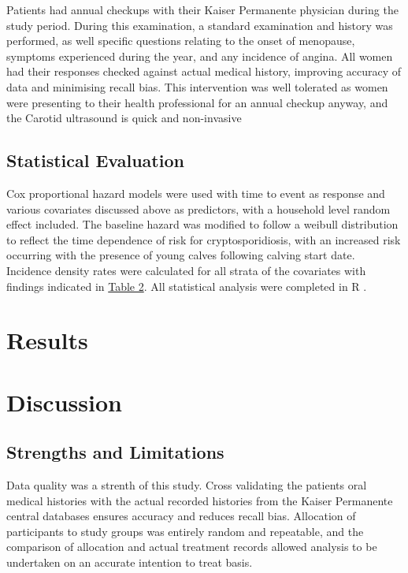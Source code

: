 \documentclass[12pt]{article}
\begin{document}
		
		Patients had annual checkups with their Kaiser Permanente physician during the study period.
		During this examination, a standard examination and history was performed, as well specific questions relating to the onset of menopause, symptoms experienced during the year, and any incidence of angina.
		All women had their responses checked against actual medical history, improving accuracy of data and minimising recall bias.
		This intervention was well tolerated as women were presenting to their health professional for an annual checkup anyway, and the Carotid ultrasound is quick and non-invasive



	\subsection{Statistical Evaluation}
		Cox proportional hazard models were used with time to event as response and various covariates discussed above as predictors, with a household level random effect included.
		The baseline hazard was modified to follow a weibull distribution to reflect the time dependence of risk for cryptosporidiosis, with an increased risk occurring with the presence of young calves following calving start date. 
		Incidence density rates were calculated for all strata of the covariates with findings indicated in \hyperref[table2]{Table 2}.
		All statistical analysis were completed in R \cite{RCoreTeam2012}.



	\section{Results}


	\section{Discussion} 


	\subsection{Strengths and Limitations}
		Data quality was a strenth of this study.
		Cross validating the patients oral medical histories with the actual recorded histories from the Kaiser Permanente central databases ensures accuracy and reduces recall bias.
		Allocation of participants to study groups was entirely random and repeatable, and the comparison of allocation and actual treatment records allowed analysis to be undertaken on an accurate intention to treat basis. 
\end{document}
